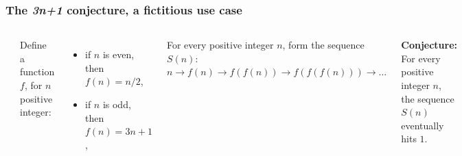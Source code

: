 \documentclass[presentation]{beamer}
\newcommand{\largeskip}{\vspace{1em}}
\def\+{\largeskip}
\begin{document}
  \begin{frame}
    \frametitle{The \emph{3n+1} conjecture, a fictitious use case}
    \label{sec:7a}

    \+
    \begin{columns}[c]
      \includegraphics[height=0.8\textheight]{3n+1}
      
      Define a function $f$, for $n$ positive integer:
      \begin{itemize}
      \item if $n$ is even, then $f(n) = n / 2$,
      \item if $n$ is odd, then $f(n) = 3n+1$,
      \end{itemize}
      
      \+
      For every positive integer $n$, form the sequence $S(n)$:
      $n \to f(n) \to f(f(n)) \to f(f(f(n))) \to \ldots$
      
      \+
      \textbf{Conjecture:} For every positive integer $n$, the sequence $S(n)$
      eventually hits $1$.
    \end{columns}
  \end{frame}
\end{document}
